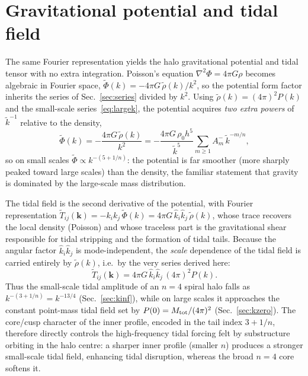\documentclass[aps,prd,onecolumn]{revtex4-2}
\newcommand{\kt}{\tilde{k}}          %
\begin{document}
\section{Gravitational potential and tidal field}
\label{sec:tidal}

The same Fourier representation yields the halo gravitational potential and
tidal tensor with no extra integration.  Poisson's equation
$\nabla^2\Phi=4\pi G\rho$ becomes algebraic in Fourier space,
$\tilde\Phi(k)=-4\pi G\,\tilde\rho(k)/k^2$, so the potential form factor
inherits the series of Sec.~\ref{sec:series} divided by $k^2$.  Using
$\tilde\rho(k)=(4\pi)^2P(k)$ and the small-scale series~\eqref{eq:largek},
the potential acquires \emph{two extra powers} of $\kt^{-1}$ relative to
the density,
\begin{equation}
\tilde\Phi(k)=-\frac{4\pi G\,\tilde\rho(k)}{k^2}
=-\frac{4\pi G\,\rho_0 h^{5}}{\kt^{5}}
\sum_{m\ge1}A_m^{-}\,\kt^{-m/n},
\label{eq:potential}
\end{equation}
so on small scales $\tilde\Phi\propto k^{-(5+1/n)}$: the potential is far
smoother (more sharply peaked toward large scales) than the density, the
familiar statement that gravity is dominated by the large-scale mass
distribution.

The tidal field is the second derivative of the potential, with Fourier
representation
$\tilde T_{ij}(\bm k)=-k_ik_j\,\tilde\Phi(k)=4\pi G\,
\hat k_i\hat k_j\,\tilde\rho(k)$,
whose trace recovers the local density (Poisson) and whose traceless part
is the gravitational shear responsible for tidal stripping and the
formation of tidal tails.  Because the angular factor $\hat k_i\hat k_j$
is mode-independent, the \emph{scale} dependence of the tidal field is
carried entirely by $\tilde\rho(k)$, i.e.\ by the very series derived here:
\begin{equation}
\tilde T_{ij}(\bm k)=4\pi G\,\hat k_i\hat k_j\,(4\pi)^2 P(k).
\label{eq:tidal}
\end{equation}
Thus the small-scale tidal amplitude of an $n=4$ spiral halo falls as
$k^{-(3+1/n)}=k^{-13/4}$ (Sec.~\ref{sec:kinf}), while on large scales it
approaches the constant point-mass tidal field set by $P(0)=M_{\rm
tot}/(4\pi)^2$ (Sec.~\ref{sec:kzero}).  The core/cusp character of the
inner profile, encoded in the tail index $3+1/n$, therefore directly
controls the high-frequency tidal forcing felt by substructure orbiting in
the halo centre: a sharper inner profile (smaller $n$) produces a stronger
small-scale tidal field, enhancing tidal disruption, whereas the broad
$n=4$ core softens it.
\end{document}
